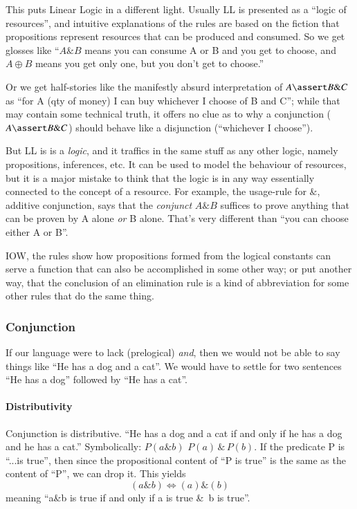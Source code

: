\documentclass{article}
\begin{document}
This puts Linear Logic in a different light. Usually LL is presented
as a ``logic of resources'', and intuitive explanations of the rules
are based on the fiction that propositions represent resources that
can be produced and consumed. So we get glosses like ``\(A\&B\) means
you can consume A or B and you get to choose, and \(A\oplus B\) means
you get only one, but you don't get to choose.''

Or we get half-stories like the manifestly absurd interpretation of
\(A\linfer B\&C\) as ``for A (qty of money) I can buy whichever I
choose of B and C''; while that may contain some technical truth, it
offers no clue as to why a conjunction (\(A\linfer B\&C\)) should
behave like a disjunction (``whichever I choose'').

But LL is is a \textit{logic}, and it traffics in the same stuff as
any other logic, namely propositions, inferences, etc. It can be used
to model the behaviour of resources, but it is a major mistake to
think that the logic is in any way essentially connected to the
concept of a resource. For example, the usage-rule for \(\&\),
additive conjunction, says that the \textit{conjunct} \(A\&B\)
suffices to prove anything that can be proven by A alone \textit{or} B
alone.  That's very different than ``you can choose either A or B''.

IOW, the rules show how propositions formed from the logical constants
can serve a function that can also be accomplished in some other way;
or put another way, that the conclusion of an elimination rule is a
kind of abbreviation for some other rules that do the same thing.

\subsubsection{Conjunction}

If our language were to lack (prelogical) \textit{and}, then we would
not be able to say things like ``He has a dog and a cat''. We would
have to settle for two sentences ``He has a dog'' followed by ``He
has a cat''.

\paragraph{Distributivity
\newline}

Conjunction is distributive. ``He has a dog and a cat if and only if
he has a dog and he has a cat.'' Symbolically: \(P(a\&b)\)\iff
\(P(a)\,\&\,P(b)\). If the predicate P is ``...is true'', then since the
propositional content of ``P is true'' is the same as the content of
``P'', we can drop it. This yields \[(a\&b)\iff (a)\&(b)\] meaning
``a\&b is true if and only if a is true \&\, b is true''.
\end{document}
